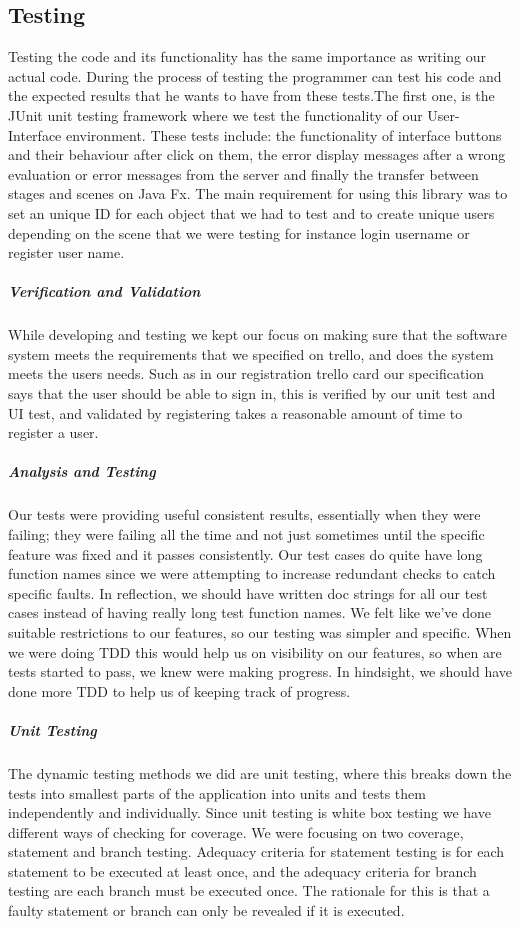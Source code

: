 \documentclass[11pt,a4paper]{report}
\begin{document}
\subsection{Testing}
Testing the code and its functionality has the same importance as writing our actual code. During the process of testing the programmer can test his code and the expected results that he wants to have from these tests.The first one, is the JUnit unit testing framework where we test the functionality of our User-Interface environment. These tests include: the functionality of interface buttons and their behaviour after click on them, the error display messages after a wrong evaluation or error messages from the server and finally the transfer between stages and scenes on Java Fx. The main requirement for using this library was to set an unique ID for each object that we had to test and to create unique users depending on the scene that we were testing for instance login username or register user name. 

\subparagraph{Verification and Validation}
While developing and testing we kept our focus on making sure that the software system meets the requirements that we specified on trello, and does the system meets the users needs. Such as in our registration trello card our specification says that the user should be able to sign in, this is verified by our unit test and UI test, and validated by registering takes a reasonable amount of time to register a user.

\subparagraph{Analysis and Testing} 
Our tests were providing useful consistent results, essentially when they were failing; they were failing all the time and not just sometimes until the specific feature was fixed and it passes consistently. Our test cases do quite have long function names since we were attempting to increase redundant checks to catch specific faults. In reflection, we should have written doc strings for all our test cases instead of having really long test function names. We felt like we’ve done suitable restrictions to our features, so our testing was simpler and specific. When we were doing TDD this would help us on visibility on our features, so when are tests started to pass, we knew were making progress. In hindsight, we should have done more TDD to help us of keeping track of progress. 


\subparagraph{Unit Testing} The dynamic testing methods we did are unit testing, where this breaks down the tests into smallest parts of the application into units and tests them independently and individually. Since unit testing is white box testing we have different ways of checking for coverage. We were focusing on two coverage, statement and branch testing. Adequacy criteria for statement testing is for each statement to be executed at least once, and the adequacy criteria for branch testing are each branch must be executed once. The rationale for this is that a faulty statement or branch can only be revealed if it is executed. 
\end{document}
